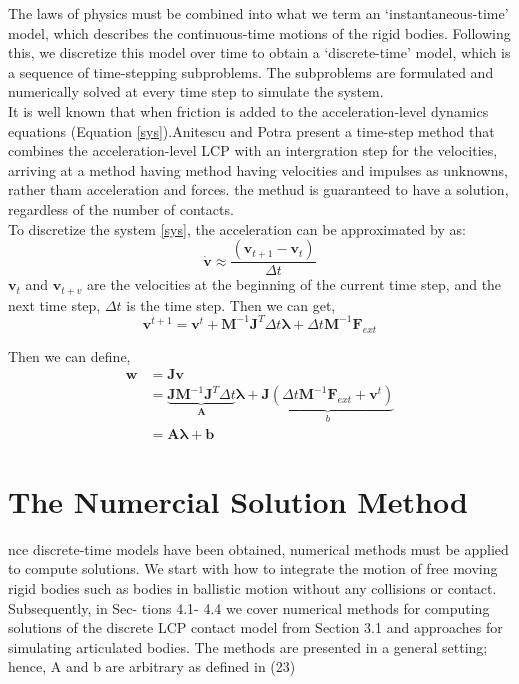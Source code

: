     The laws of physics must be combined into what we term an `instantaneous-time' model, which describes the continuous-time motions of the rigid bodies. Following this, we discretize this model over time to obtain a ‘discrete-time’ model, which is a sequence of time-stepping subproblems. The subproblems are formulated and numerically solved at every time step to simulate the system. \\
    It is well known that when friction is added to the acceleration-level dynamics equations (Equation \ref{sys}).Anitescu and Potra \cite{anitescu1997modeling} present a time-step method that combines the acceleration-level LCP with an intergration step for the velocities, arriving at a method having method having velocities and impulses as unknowns, rather tham acceleration and forces. the methud is guaranteed to have a solution, regardless of the number of contacts. \\
    To discretize the system \ref{sys}, the acceleration can be approximated by \cite{anitescu1997modeling} as:
    \begin{equation}
        \dot{\mathbf{v}} \approx \frac{(\mathbf{v}_{t+1} - \mathbf{v}_t)}{\Delta t}
    \end{equation}
    $\mathbf{v}_t$ and $\mathbf{v}_{t+v}$ are the velocities at the beginning of the current time step, and the next time step, $\Delta t$ is the time step. Then we can get,
    \begin{equation}
        \mathbf{v}^{t+1} = \mathbf{v}^{t} + \pmb{M}^{-1}\pmb{J}^{T}\Delta{t}\pmb{\lambda} + \Delta{t}\pmb{M}^{-1}\mathbf{F}_{ext}
    \end{equation}

    Then we can define,
    \begin{equation}
    \begin{aligned}
        \mathbf{w} & = \pmb{J}\mathbf{v} \\
        & =  \underbrace{\pmb{J}\pmb{M}^{-1}\pmb{J}^{T}\Delta{t}}_{\pmb{A}}\pmb{\lambda} + \underbrace{\pmb{J}(\Delta{t}\pmb{M}^{-1}\mathbf{F}_{ext} + \mathbf{v}^{t})}_{b} \\
        & = \pmb{A}\pmb{\lambda} + \pmb{b} 
    \end{aligned} 
    \end{equation}

\section{The Numercial Solution Method}
    nce discrete-time models have been obtained, numerical methods must be applied to compute solutions. We start with how to integrate the motion of free moving rigid bodies such as bodies in ballistic motion without any collisions or contact. Subsequently, in Sec- tions 4.1- 4.4 we cover numerical methods for computing solutions of the discrete LCP contact model from Section 3.1 and approaches for simulating articulated bodies. The methods are presented in a general setting; hence, A and b are arbitrary as defined in (23)

